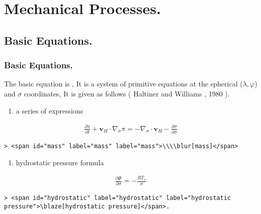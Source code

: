 \hypertarget{mechanical-processes.}{%
\section{Mechanical Processes.}\label{mechanical-processes.}}

\hypertarget{basic-equations.}{%
\subsection{Basic Equations.}\label{basic-equations.}}

\hypertarget{basic-equations.-1}{%
\subsubsection{Basic Equations.}\label{basic-equations.-1}}

The basic equation is , It is a system of primitive equations at the
spherical (\(\lambda,\varphi\)) and \(\sigma\) coordinates, It is given
as follows ( Haltiner and Williams , 1980 ).

\begin{enumerate}
\def\labelenumi{\arabic{enumi}.}
\tightlist
\item
  a series of expressions
\end{enumerate}

\begin{eqnarray}
  \frac{\partial \pi}{\partial t} 
    + \mathbf{v}_{H} \cdot \nabla_{\sigma} \pi
     =  - \nabla_{\sigma} \cdot \mathbf{v}_{H} 
          - \frac{\partial \dot{\sigma}}{\partial \sigma}
\end{eqnarray}

\begin{verbatim}
> <span id="mass" label="mass" label="mass">\\\\blur[mass]</span>
\end{verbatim}

\begin{enumerate}
\def\labelenumi{\arabic{enumi}.}
\setcounter{enumi}{1}
\tightlist
\item
  hydrostatic pressure formula
\end{enumerate}

\begin{eqnarray}
  \frac{\partial \Phi}{\partial \sigma} = - \frac{RT_v}{\sigma} 
\end{eqnarray}

\begin{verbatim}
> <span id="hydrostatic" label="hydrostatic" label="hydrostatic pressure">\blaze[hydrostatic pressure]</span>.
\end{verbatim}

